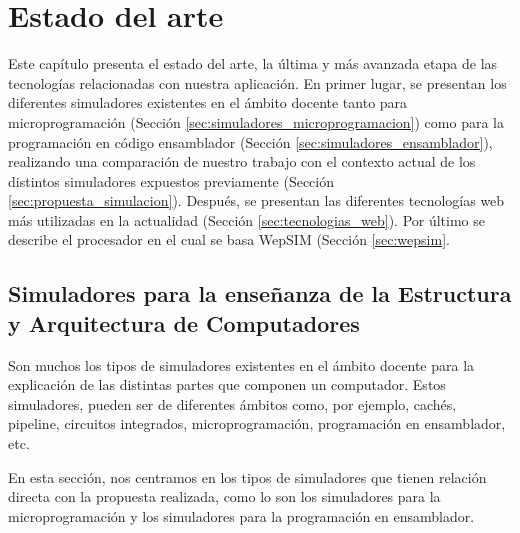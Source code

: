 \chead[]{}
\renewcommand{\headrulewidth}{0.5pt}

\lfoot[]{}
\cfoot[]{}
\rfoot[]{}
\renewcommand{\footrulewidth}{0pt}

\chapter{Estado del arte}
\label{ch:state_of_the_art}

Este capítulo presenta el estado del arte, la última y más avanzada etapa de las tecnologías relacionadas con nuestra aplicación. En primer lugar, se presentan los diferentes simuladores existentes en el ámbito docente tanto para microprogramación (Sección \ref{sec:simuladores_microprogramacion}) como para la programación en código ensamblador (Sección \ref{sec:simuladores_ensamblador}), realizando una comparación de nuestro trabajo con el contexto actual de los distintos simuladores expuestos previamente (Sección \ref{sec:propuesta_simulacion}). Después, se presentan las diferentes tecnologías web más utilizadas en la actualidad (Sección \ref{sec:tecnologias_web}). Por último se describe el procesador en el cual se basa WepSIM (Sección \ref{sec:wepsim}.

\section{Simuladores para la enseñanza de la Estructura y Arquitectura de Computadores}

Son muchos los tipos de simuladores existentes en el ámbito docente para la explicación de las distintas partes que componen un computador. Estos simuladores, pueden ser de diferentes ámbitos como, por ejemplo, cachés, pipeline, circuitos integrados, microprogramación, programación en ensamblador, etc.

En esta sección, nos centramos en los tipos de simuladores que tienen relación directa con la propuesta realizada, como lo son los simuladores para la microprogramación y los simuladores para la programación en ensamblador.

